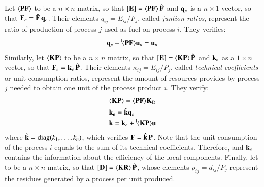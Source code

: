 \documentclass{ecos2018}
\begin{document}
Let $\langle \textbf{PF} \rangle$ to be a $n \times n$ matrix, so that $\left[ \textbf{E} \right]=\langle \textbf{PF} \rangle\,\hat{\mathbf{F}}$ and $\mathbf{q}_e$ is a $n \times 1$ vector, so that $\mathbf{F}_e=\hat{\mathbf{F}}\,\mathbf{q}_e$. Their elements $q_{ij}=E_{ij}/F_j$, called \emph{juntion ratios}, represent the ratio of production of process $j$ used as fuel on process $i$. They verifies:
\begin{equation}
\label{eq:vmqe}
\mathbf{q}_e+\prescript{\smash{\mathsf{t}}}{}{\mskip-1mu}\langle \textbf{PF} \rangle\mathbf{u}_n=\mathbf{u}_n
\end{equation}
Similarly, let   $\langle \textbf{KP} \rangle$ to be a $n\times n$ matrix, so that $\left[ \textbf{E} \right]=\langle \textbf{KP} \rangle\,\hat{\mathbf{P}}$ and $\mathbf{k}_e$ as a $1 \times n$ vector, so that $\mathbf{F}_e=\mathbf{k}_e\,\hat{\mathbf{P}}$. Their elements $\kappa_{ij}=E_{ij}/P_j$, called \emph{technical coefficients} or unit consumption ratios, represent the amount of resources  provides by process $j$ needed to obtain one unit of the process product $i$. They verify:
\begin{align}
&\langle \textbf{KP} \rangle=\langle \textbf{PF} \rangle\mathbf{K}_\mathrm{D} \\
&\mathbf{k_e}=\hat{\mathbf{k}} \mathbf{q}_e \\
&\mathbf{k}=\mathbf{k}_e+\prescript{\smash{\mathsf{t}}}{}{\mskip-1mu}\langle \textbf{KP} \rangle\mathbf{u} \label{eq:vke}
\end{align}
where $\hat{\mathbf{k}}=\text{diag}(k_1,\ldots,k_n)$, which verifies $\mathbf{F}=\hat{\mathbf{k}}\,\mathbf{P}$. Note that the unit consumption of the process $i$ equals to the sum of its technical coefficients. Therefore,  and $\mathbf{k}_e$ contains the information about the efficiency of the local components.
Finally, let  to be a $n\times n$ matrix, so that $\left[ \textbf{D} \right]=\langle \textbf{KR} \rangle\,\hat{\mathbf{P}}$, whose elements $\rho_{ij}=d_{ij}/P_j$ represent the residues generated by a process per unit produced.
 
\end{document}
